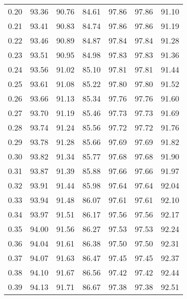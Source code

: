 \begin{tabular}{|c|c|c|c|c|c|c|}
      0.20 &     93.36 &     90.76 &      84.61 &   97.86 &      97.86 &         91.10 \\
      0.21 &     93.41 &     90.83 &      84.74 &   97.86 &      97.86 &         91.19 \\
      0.22 &     93.46 &     90.89 &      84.87 &   97.84 &      97.84 &         91.28 \\
      0.23 &     93.51 &     90.95 &      84.98 &   97.83 &      97.83 &         91.36 \\
      0.24 &     93.56 &     91.02 &      85.10 &   97.81 &      97.81 &         91.44 \\
      0.25 &     93.61 &     91.08 &      85.22 &   97.80 &      97.80 &         91.52 \\
      0.26 &     93.66 &     91.13 &      85.34 &   97.76 &      97.76 &         91.60 \\
      0.27 &     93.70 &     91.19 &      85.46 &   97.73 &      97.73 &         91.69 \\
      0.28 &     93.74 &     91.24 &      85.56 &   97.72 &      97.72 &         91.76 \\
      0.29 &     93.78 &     91.28 &      85.66 &   97.69 &      97.69 &         91.82 \\
      0.30 &     93.82 &     91.34 &      85.77 &   97.68 &      97.68 &         91.90 \\
      0.31 &     93.87 &     91.39 &      85.88 &   97.66 &      97.66 &         91.97 \\
      0.32 &     93.91 &     91.44 &      85.98 &   97.64 &      97.64 &         92.04 \\
      0.33 &     93.94 &     91.48 &      86.07 &   97.61 &      97.61 &         92.10 \\
      0.34 &     93.97 &     91.51 &      86.17 &   97.56 &      97.56 &         92.17 \\
      0.35 &     94.00 &     91.56 &      86.27 &   97.53 &      97.53 &         92.24 \\
      0.36 &     94.04 &     91.61 &      86.38 &   97.50 &      97.50 &         92.31 \\
      0.37 &     94.07 &     91.63 &      86.47 &   97.45 &      97.45 &         92.37 \\
      0.38 &     94.10 &     91.67 &      86.56 &   97.42 &      97.42 &         92.44 \\
      0.39 &     94.13 &     91.71 &      86.67 &   97.38 &      97.38 &         92.51 \\

\end{tabular}
